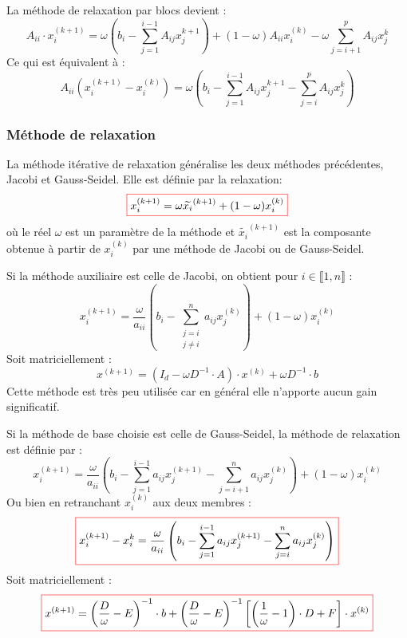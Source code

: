\documentclass{beamer}
\newcommand{\myredbox}[1]{\fcolorbox{red}{white}{$\displaystyle#1$}}
\begin{document}
\begin{frame}
La méthode de relaxation par blocs devient :
\[
A_{ii} \cdot x_i^{(k+1)} = \omega \left( b_i - \sum_{j=1}^{i-1} A_{ij} x_j^{k+1} \right) + \left( 1 - \omega \right) A_{ii} x_i^{(k)} - \omega \sum_{j=i+1}^{p} A_{ij} x_j^{k}
\]
Ce qui est équivalent à :
\[
A_{ii} \left( x_i^{(k+1)} -  x_i^{(k)} \right) = \omega \left( b_i - \sum_{j=1}^{i-1} A_{ij} x_j^{k+1} - \sum_{j=i}^{p} A_{ij} x_j^{k} \right) 
\]


\end{frame}

\begin{frame}
\frametitle{Méthode de relaxation}

La méthode itérative de relaxation généralise les deux méthodes précédentes, Jacobi et Gauss-Seidel.
Elle est définie par la relaxation:
\[\myredbox{
x_i^{(k+1)} = \omega \widetilde{x_i}^{(k+1)} + (1 - \omega) x_i^{(k)}}
\]
où le réel $\omega$ est un paramètre de la méthode et $\widetilde{x_i}^{(k+1)} $ est la composante obtenue à partir de $x_i^{(k)}$ par une méthode de Jacobi ou de Gauss-Seidel.

Si la méthode auxiliaire est celle de Jacobi, on obtient pour $i \in \llbracket 1, n \rrbracket $ :
\[
x_i^{(k+1)} = \frac{\omega}{a_{ii}} \left( b_i - \sum_{\substack{j=i\\j \neq i}}^n a_{ij} x_j^{(k)} \right) + ( 1 - \omega) x_i ^{(k)}
\]
Soit matriciellement :
\[
x^{(k+1)}= \left( I_d - \omega D^{-1} \cdot A \right) \cdot x^{(k)} + \omega D^{-1} \cdot b
\]
Cette méthode est très peu utilisée car en général elle n'apporte aucun gain significatif. 

\end{frame}

\begin{frame}
Si la méthode de base choisie est celle de Gauss-Seidel, la méthode de relaxation est définie par :
\[
x_i^{(k+1)} = \frac{\omega}{a_{ii}} \left( b_i - \sum_{j=1}^{i-1} a_{ij} x_j^{(k+1)}  - \sum_{j=i+1}^n a_{ij} x_j^{(k)} \right) + ( 1 - \omega) x_i ^{(k)}
\]
Ou bien en retranchant $x_i^{(k)}$ aux deux membres :
\[
\myredbox{x_i^{(k+1)} -x_i^{k}= \frac{\omega}{a_{ii}} \left( b_i - \sum_{j=1}^{i-1} a_{ij} x_j^{(k+1)}  - \sum_{j=i}^n a_{ij} x_j^{(k)} \right) }
\]
Soit matriciellement :
\[\myredbox{
x^{(k+1)}= \left( \frac{D}{\omega} - E  \right)^{-1} \cdot b +  \left( \frac{D}{\omega} - E  \right)^{-1} \left[ \left( \frac{1}{\omega} -1 \right) \cdot D + F \right] \cdot x^{(k)}
}\]

\end{frame}
\end{document}
